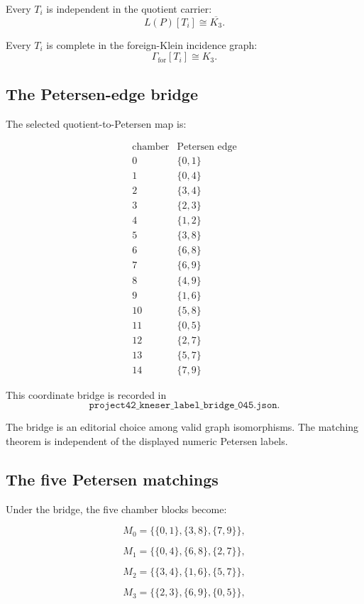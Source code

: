 Every \(T_i\) is independent in the quotient carrier:
\[
L(P)[T_i]\cong\overline{K_3}.
\]

Every \(T_i\) is complete in the foreign-Klein incidence graph:
\[
\Gamma_{\mathrm{for}}[T_i]\cong K_3.
\]

\subsection{The Petersen-edge bridge}

The selected quotient-to-Petersen map is:

\[
\begin{array}{c|c}
\text{chamber} & \text{Petersen edge}\\
\hline
0 & \{0,1\}\\
1 & \{0,4\}\\
2 & \{3,4\}\\
3 & \{2,3\}\\
4 & \{1,2\}\\
5 & \{3,8\}\\
6 & \{6,8\}\\
7 & \{6,9\}\\
8 & \{4,9\}\\
9 & \{1,6\}\\
10 & \{5,8\}\\
11 & \{0,5\}\\
12 & \{2,7\}\\
13 & \{5,7\}\\
14 & \{7,9\}
\end{array}
\]

This coordinate bridge is recorded in
\[
\texttt{project42\_kneser\_label\_bridge\_045.json}.
\]

The bridge is an editorial choice among valid graph isomorphisms. The
matching theorem is independent of the displayed numeric Petersen
labels.

\subsection{The five Petersen matchings}

Under the bridge, the five chamber blocks become:

\[
M_0
=
\bigl\{
\{0,1\},
\{3,8\},
\{7,9\}
\bigr\},
\]

\[
M_1
=
\bigl\{
\{0,4\},
\{6,8\},
\{2,7\}
\bigr\},
\]

\[
M_2
=
\bigl\{
\{3,4\},
\{1,6\},
\{5,7\}
\bigr\},
\]

\[
M_3
=
\bigl\{
\{2,3\},
\{6,9\},
\{0,5\}
\bigr\},
\]

